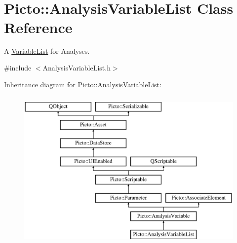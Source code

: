 \hypertarget{class_picto_1_1_analysis_variable_list}{\section{Picto\-:\-:Analysis\-Variable\-List Class Reference}
\label{class_picto_1_1_analysis_variable_list}
}


A \hyperlink{class_picto_1_1_variable_list}{Variable\-List} for Analyses.  




{\ttfamily \#include $<$Analysis\-Variable\-List.\-h$>$}

Inheritance diagram for Picto\-:\-:Analysis\-Variable\-List\-:\begin{figure}[H]
\begin{center}
\leavevmode
\includegraphics[height=8.000000cm]{class_picto_1_1_analysis_variable_list}
\end{center}
\end{figure}
